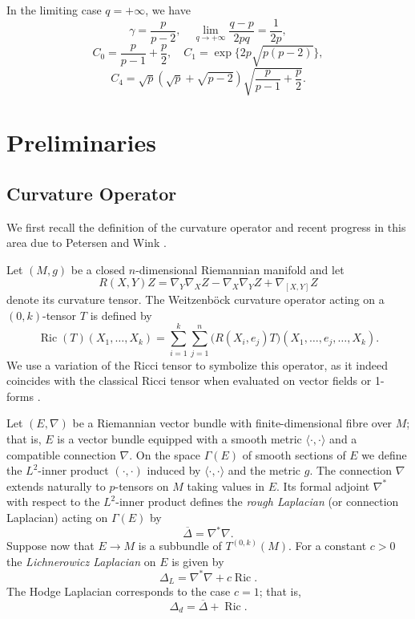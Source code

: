 \documentclass[12pt, twoside]{article}
\theoremstyle{definition}
\numberwithin{equation}{section}
\begin{document}
In the limiting case \(q = +\infty\), we have
\[
\gamma = \frac{p}{p-2}, \quad \lim_{q\rightarrow+\infty}\frac{q-p}{2pq} = \frac{1}{2p}, \]
\[C_{0}=\frac{p}{p-1}+\frac{p}{2},\quad C_1 = \exp\bigl\{2p\sqrt{p(p-2)}\bigr\},
\]
\[
C_4 =\sqrt{p}(\sqrt{p}+\sqrt{p-2})\sqrt{\frac{p}{p-1}+\frac{p}{2}}.
\]

	\section{Preliminaries}
	
	\subsection{Curvature Operator} 
	We first recall the definition of the curvature operator and recent progress in this area due to Petersen and Wink \cite{Petersen2021}.
	
	Let \((M,g)\) be a closed \(n\)-dimensional Riemannian manifold and let 
	\[
	R(X,Y)Z = \nabla_Y\nabla_X Z - \nabla_X\nabla_Y Z + \nabla_{[X,Y]}Z
	\] 
	denote its curvature tensor. The Weitzenb\"ock curvature operator acting on a \((0,k)\)-tensor \(T\) is defined by
	\[
	\operatorname{Ric}(T)(X_1,\dots,X_k) = \sum_{i=1}^k \sum_{j=1}^n \bigl(R(X_i,e_j)T\bigr)(X_1,\dots,e_j,\dots,X_k).
	\]
	We use a variation of the Ricci tensor to symbolize this operator, as it indeed coincides with the classical Ricci tensor when evaluated on vector fields or 1-forms \cite{Petersen1998}.
	
Let \((E,\nabla)\) be a Riemannian vector bundle with finite-dimensional fibre over \(M\); that is, \(E\) is a vector bundle equipped with a smooth metric \(\langle\cdot,\cdot\rangle\) and a compatible connection \(\nabla\). On the space \(\Gamma(E)\) of smooth sections of \(E\) we define the \(L^{2}\)-inner product \((\cdot,\cdot)\) induced by \(\langle\cdot,\cdot\rangle\) and the metric \(g\). The connection \(\nabla\) extends naturally to \(p\)-tensors on \(M\) taking values in \(E\). Its formal adjoint \(\nabla^{*}\) with respect to the \(L^{2}\)-inner product defines the \emph{rough Laplacian} (or connection Laplacian) acting on \(\Gamma(E)\) by
\[
\overline{\Delta} = \nabla^{*}\nabla .
\]
Suppose now that \(E \to M\) is a subbundle of \(T^{(0,k)}(M)\). For a constant \(c>0\) the \emph{Lichnerowicz Laplacian} on \(E\) is given by
\[
\Delta_{L} = \nabla^{*}\nabla + c\operatorname{Ric}.
\]
The Hodge Laplacian corresponds to the case \(c = 1\); that is,
\[
\Delta_{d} =\overline{\Delta}+ \operatorname{Ric}.
\]
\end{document}
